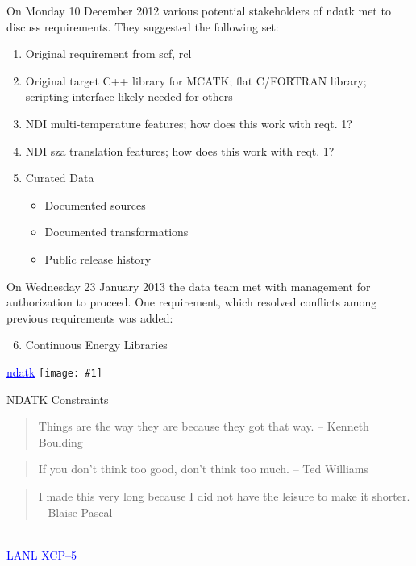 \documentclass[clock]{slides}
\newenvironment{xslide}[1][logo.jpg]{\begin{slide} \tiny
\textcolor{blue}{\underline{ndatk}} \hfill
\texttt{[image: \#1]}
\normalsize}{\vfill\tiny
\textcolor{blue}{\hrulefill \\LANL XCP--5}
\end{slide}}
\begin{document}
\begin{note}\small
On Monday 10 December 2012 various potential stakeholders of ndatk met
to discuss requirements.  They suggested the following set:  
\begin{enumerate}
\item Original requirement from scf, rcl
\item Original target C++ library for MCATK; flat C/FORTRAN library;
  scripting interface likely needed for others
\item NDI multi-temperature features; how does this work with reqt. 1?
\item NDI sza translation features; how does this work with reqt. 1?
\item Curated Data
  \begin{itemize}
    \item Documented sources
    \item Documented transformations
    \item Public release history
  \end{itemize}
\end{enumerate}
On Wednesday 23 January 2013 the data team met with management for
authorization to proceed.  One requirement, which resolved conflicts
among previous requirements was added:
\begin{enumerate}
\setcounter{enumi}{5}
\item Continuous Energy Libraries
\end{enumerate}
\end{note}

\begin{xslide}
\begin{center}\Large
NDATK Constraints
\end{center}
\begin{quote}
Things are the way they are because they got that way.
\flushright -- Kenneth Boulding
\end{quote}
\begin{quote}
If you don't think too good, don't think too much.
\flushright -- Ted Williams
\end{quote}
\begin{quote}
I made this very long because I did not have the leisure to make it
shorter.
\flushright -- Blaise Pascal
\end{quote}
\end{xslide}
\end{document}
